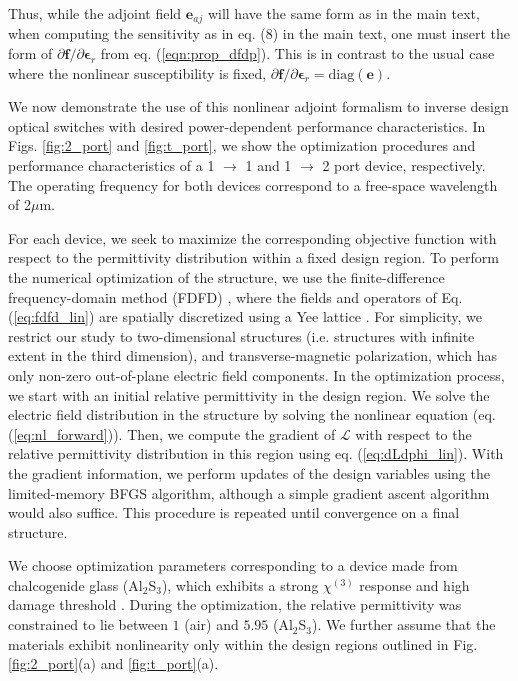 Thus, while the adjoint field $\mathbf{e}_{aj}$ will have the same form as in the main text, when computing the sensitivity as in eq. (8) in the main text, one must insert the form of $\partial \mathbf{f} / \partial \bm{\epsilon}_r$ from eq. (\ref{eqn:prop_dfdp}).  This is in contrast to the usual case where the nonlinear susceptibility is fixed, $\partial \mathbf{f} / \partial \bm{\epsilon}_r = \textrm{diag}\left( \mathbf{e} \right)$.



We now demonstrate the use of this nonlinear adjoint formalism to inverse design optical switches with desired power-dependent performance characteristics.  In Figs. \ref{fig:2_port} and \ref{fig:t_port}, we show the optimization procedures and performance characteristics of a 1 $\to$ 1 and 1 $\to$ 2 port device, respectively. The operating frequency for both devices correspond to a free-space wavelength of 2$\mu$m. 

For each device, we seek to maximize the corresponding objective function with respect to the permittivity distribution within a fixed design region.  To perform the numerical optimization of the structure, we use the finite-difference frequency-domain method (FDFD) \cite{shin2012choice}, where the fields and operators of Eq. (\ref{eq:fdfd_lin}) are spatially discretized using a Yee lattice \cite{yee1966numerical}. For simplicity, we restrict our study to two-dimensional structures (i.e. structures with infinite extent in the third dimension), and transverse-magnetic polarization, which has only non-zero out-of-plane electric field components. In the optimization process, we start with an initial relative permittivity in the design region.  We solve the electric field distribution in the structure by solving the nonlinear equation (eq. (\ref{eq:nl_forward})).  Then, we compute the gradient of $\mathcal{L}$ with respect to the relative permittivity distribution in this region using eq. (\ref{eq:dLdphi_lin}).  With the gradient information, we perform updates of the design variables using the limited-memory BFGS \cite{byrd1995limited} algorithm, although a simple gradient ascent algorithm would also suffice.  This procedure is repeated until convergence on a final structure. 

We choose optimization parameters corresponding to a device made from chalcogenide glass (Al$_2$S$_3$), which exhibits a strong $\chi^{(3)}$ response and high damage threshold \cite{White_OptLett_2011,Lamont_OptExpress_2008,Boyd__2008}.  During the optimization, the relative permittivity was constrained to lie between $1$ (air) and $5.95$ (Al$_2$S$_3$).  We further assume that the materials exhibit nonlinearity only within the design regions outlined in Fig. \ref{fig:2_port}(a) and \ref{fig:t_port}(a).


